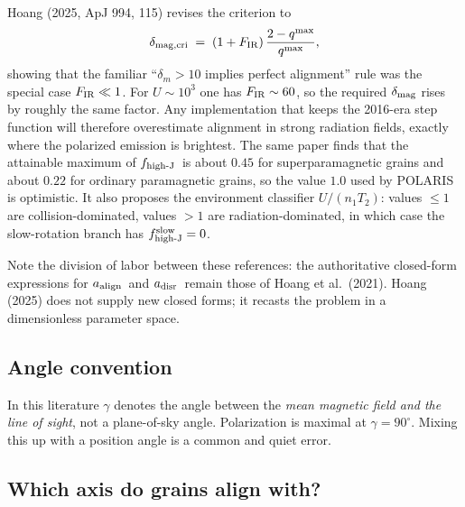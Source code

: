 \documentclass{my_memo}
\newcommand{\aalign}{\ensuremath{a_{\rm align}}}
\newcommand{\adisr}{\ensuremath{a_{\rm disr}}}
\newcommand{\fhighJ}{\ensuremath{f_{\rm high\text{-}J}}}
\begin{document}
Hoang (2025, ApJ 994, 115) revises the criterion to
\begin{equation}
  \delta_{\rm mag,cri} \;=\; (1 + F_{\rm IR})\,
  \frac{2 - q^{\max}}{q^{\max}},
  \label{eq:deltacri}
\end{equation}
showing that the familiar ``$\delta_m > 10$ implies perfect alignment''
rule was the special case $F_{\rm IR} \ll 1$. For $U \sim 10^3$ one has
$F_{\rm IR} \sim 60$, so the required $\delta_{\rm mag}$ rises by roughly
the same factor. Any implementation that keeps the 2016-era step function
will therefore overestimate alignment in strong radiation fields, exactly
where the polarized emission is brightest. The same paper finds that the
attainable maximum of \fhighJ\ is about $0.45$ for superparamagnetic
grains and about $0.22$ for ordinary paramagnetic grains, so the value
$1.0$ used by POLARIS is optimistic. It also proposes the environment
classifier $U/(n_1 T_2)$: values $\leq 1$ are collision-dominated, values
$>1$ are radiation-dominated, in which case the slow-rotation branch has
$f^{\rm slow}_{\rm high\text{-}J} = 0$.

Note the division of labor between these references: the authoritative
closed-form expressions for \aalign\ and \adisr\ remain those of Hoang et
al.\ (2021). Hoang (2025) does not supply new closed forms; it recasts
the problem in a dimensionless parameter space.

\subsection{Angle convention}

In this literature $\gamma$ denotes the angle between the \emph{mean
magnetic field and the line of sight}, not a plane-of-sky angle.
Polarization is maximal at $\gamma = 90^\circ$. Mixing this up with a
position angle is a common and quiet error.

\subsection{Which axis do grains align with?}
\label{sec:krat}
\end{document}
